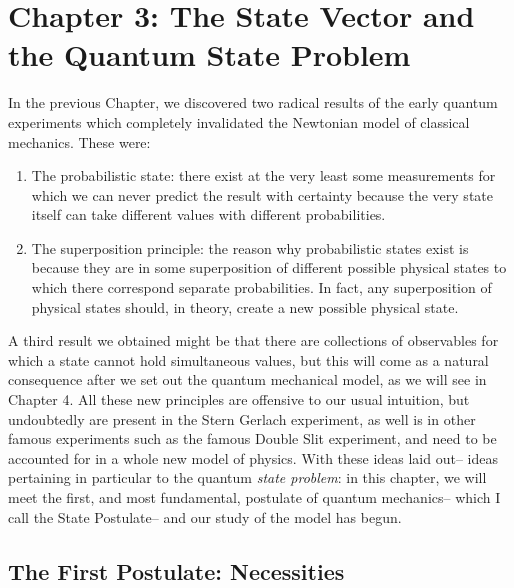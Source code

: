 \chapter{Chapter 3: The State Vector and the Quantum State Problem}
In the previous Chapter, we discovered two radical results of the early quantum experiments which completely invalidated the Newtonian model of classical mechanics. These were:
\begin{enumerate}
    \item The probabilistic state: there exist at the very least some measurements for which we can never predict the result with certainty because the very state itself can take different values with different probabilities.
    \item The superposition principle: the reason why probabilistic states exist is because they are in some superposition of different possible physical states to which there correspond separate probabilities. In fact, any superposition of physical states should, in theory, create a new possible physical state.
\end{enumerate} 
A third result we obtained might be that there are collections of observables for which a state cannot hold simultaneous values, but this will come as a natural consequence after we set out the quantum mechanical model, as we will see in Chapter 4. All these new principles are offensive to our usual intuition, but undoubtedly are present in the Stern Gerlach experiment, as well is in other famous experiments such as the famous Double Slit experiment, and need to be accounted for in a whole new model of physics. With these ideas laid out-- ideas pertaining in particular to the quantum \textit{state problem}: in this chapter, we will meet the first, and most fundamental, postulate of quantum mechanics-- which I call the State Postulate-- and our study of the model has begun.
\section{The First Postulate: Necessities}
